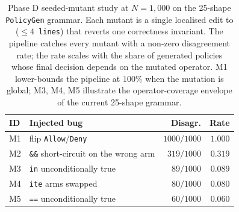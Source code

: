\begin{table}[t]
\centering
\footnotesize
\setlength{\tabcolsep}{4pt}
\begin{tabular}{llrr}
\toprule
ID & Injected bug                                & Disagr. & Rate \\
\midrule
M1 & flip \texttt{Allow}/\texttt{Deny}            & $1000 / 1000$ & $1.000$ \\
M2 & \texttt{\&\&} short-circuit on the wrong arm & $319 / 1000$  & $0.319$ \\
M3 & \texttt{in} unconditionally true             & $89 / 1000$   & $0.089$ \\
M4 & \texttt{ite} arms swapped                    & $80 / 1000$   & $0.080$ \\
M5 & \texttt{==} unconditionally true             & $60 / 1000$   & $0.060$ \\
\bottomrule
\end{tabular}
\caption{Phase D seeded-mutant study at $N = 1{,}000$ on the 25-shape
\texttt{PolicyGen} grammar. Each mutant is a single localised edit
to \cedargo (\texttt{$\le 4$ lines}) that reverts one correctness
invariant. The pipeline catches every mutant with a non-zero
disagreement rate; the rate scales with the share of generated
policies whose final decision depends on the mutated operator.
M1 lower-bounds the pipeline at $100\%$ when the mutation
is global; M3, M4, M5 illustrate the operator-coverage envelope of
the current 25-shape grammar.}
\label{tbl:phase-d-mutants}
\end{table}
